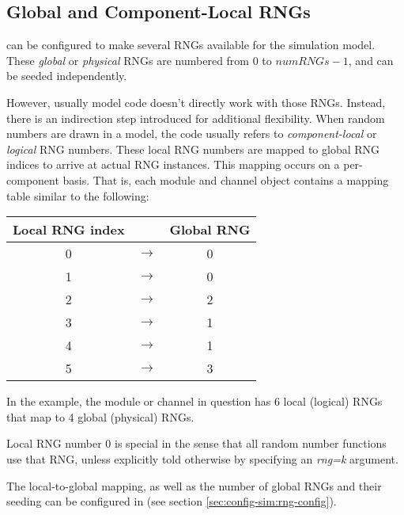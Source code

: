 \subsection{Global and Component-Local RNGs}
\label{sec:sim-lib:global-and-component-local-rngs}

{\opp} can be configured to make several RNGs available for the simulation
model. These \textit{global} or \textit{physical} RNGs are numbered from
$0$ to $numRNGs-1$, and can be seeded independently.

However, usually model code doesn't directly work with those RNGs. Instead,
there is an indirection step introduced for additional flexibility. When
random numbers are drawn in a model, the code usually refers to
\textit{component-local} or \textit{logical} RNG numbers. These
local RNG numbers are mapped to global RNG indices to arrive at
actual RNG instances. This mapping occurs on a per-component basis. That is,
each module and channel object contains a mapping table similar to the
following:

\begin{center}
\begin{tabular}{ c c c }
Local RNG index &               & Global RNG \\ \hline
              0 & $\rightarrow$ & 0 \\
              1 & $\rightarrow$ & 0 \\
              2 & $\rightarrow$ & 2 \\
              3 & $\rightarrow$ & 1 \\
              4 & $\rightarrow$ & 1 \\
              5 & $\rightarrow$ & 3 \\
\end{tabular}
\end{center}

In the example, the module or channel in question has 6 local (logical)
RNGs that map to 4 global (physical) RNGs.

\begin{note}
Local RNG number 0 is special in the sense that all random number functions
use that RNG, unless explicitly told otherwise by specifying an \textit{rng=k}
argument.
\end{note}

The local-to-global mapping, as well as the number of global
RNGs and their seeding can be configured in  (see
section \ref{sec:config-sim:rng-config}).

